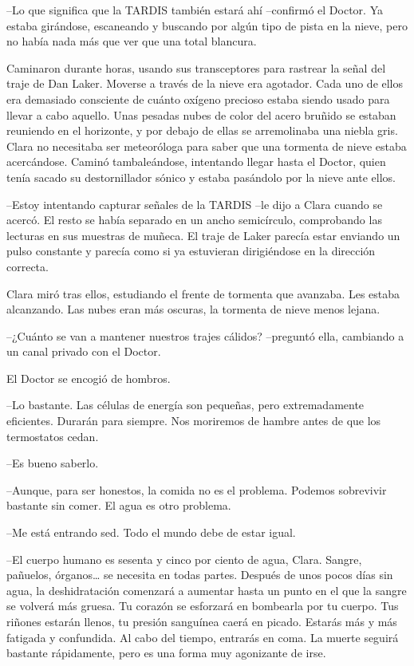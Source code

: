 {--Lo que significa que la TARDIS también estará ahí --confirmó el
 Doctor. Ya estaba girándose, escaneando y buscando por algún tipo de
 pista en la nieve, pero no había nada más que ver que una total
blancura.}

{Caminaron durante horas, usando sus
 transceptores para rastrear la señal del traje de Dan Laker. Moverse a
 través de la nieve era agotador. Cada uno de ellos era demasiado
 consciente de cuánto oxígeno precioso estaba siendo usado para llevar a
 cabo aquello. Unas pesadas nubes de color del acero bruñido se estaban
 reuniendo en el horizonte, y por debajo de ellas se arremolinaba una
 niebla gris. Clara no necesitaba ser meteoróloga para saber que una
 tormenta de nieve estaba acercándose. Caminó tambaleándose, intentando
 llegar hasta el Doctor, quien tenía sacado su destornillador sónico y
estaba pasándolo por la nieve ante ellos.}

{--Estoy intentando capturar señales de la TARDIS --le dijo a Clara
 cuando se acercó. El resto se había separado en un ancho semicírculo,
 comprobando las lecturas en sus muestras de muñeca. El traje de Laker
 parecía estar enviando un pulso constante y parecía como si ya
estuvieran dirigiéndose en la dirección correcta.}

{Clara miró tras ellos, estudiando el frente de tormenta que avanzaba.
 Les estaba alcanzando. Las nubes eran más oscuras, la tormenta de nieve
menos lejana.}

{--¿Cuánto se van a mantener nuestros trajes cálidos? --preguntó ella,
cambiando a un canal privado con el Doctor.}

{El Doctor se encogió de hombros.}

{--Lo bastante. Las células de energía son pequeñas, pero extremadamente
 eficientes. Durarán para siempre. Nos moriremos de hambre antes de que
los termostatos cedan.}

{--Es bueno saberlo.}

{--Aunque, para ser honestos, la comida no es el problema. Podemos
sobrevivir bastante sin comer. El agua es otro problema.}

{--Me está entrando sed. Todo el mundo debe de estar igual.}

{--El cuerpo humano es sesenta y cinco por ciento de agua, Clara. Sangre,
 pañuelos, órganos\ldots{} se necesita en todas partes. Después de unos
 pocos días sin agua, la deshidratación comenzará a aumentar hasta un
 punto en el que la sangre se volverá más gruesa. Tu corazón se esforzará
 en bombearla por tu cuerpo. Tus riñones estarán llenos, tu presión
 sanguínea caerá en picado. Estarás más y más fatigada y confundida. Al
 cabo del tiempo, entrarás en coma. La muerte seguirá bastante
rápidamente, pero es una forma muy agonizante de irse.}

